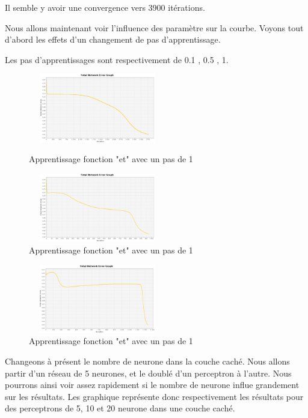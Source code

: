 \documentclass[twoside,openright,a4paper,11pt,french]{article}
\begin{document}
Il semble y avoir une convergence vers 3900 itérations.

Nous allons maintenant voir l'influence des paramètre sur la courbe. Voyons tout d'abord
les effets d'un changement de pas d'apprentissage.

Les pas d'apprentissages sont respectivement de 0.1 , 0.5 , 1.

\begin{figure}[h]
\caption{Apprentissage fonction "et" avec un pas de 1}
\includegraphics[width=6cm,height=3cm]{./pics/eq/multi_eq_0.1.eps}
\label{fig:anderr4}
\end{figure}

\begin{figure}[h]
\includegraphics[width=6cm,height=3cm]{./pics/eq/multi_eq_0.5.eps}
\caption{Apprentissage fonction "et" avec un pas de 1}
\label{fig:anderr4}
\end{figure}

\begin{figure}[h]
\includegraphics[width=6cm,height=3cm]{./pics/eq/multi_eq_1.eps}
\caption{Apprentissage fonction "et" avec un pas de 1}
\label{fig:anderr4}
\end{figure}

Changeons à présent le nombre de neurone dans la couche caché.
Nous allons partir d'un réseau de 5 neurones, et le doublé d'un perceptron
à l'autre. Nous pourrons ainsi voir assez rapidement si le nombre de neurone
influe grandement sur les résultats.
Les graphique représente donc respectivement les résultats pour
des perceptrons de 5, 10 et 20 neurone dans une couche caché.
\end{document}
